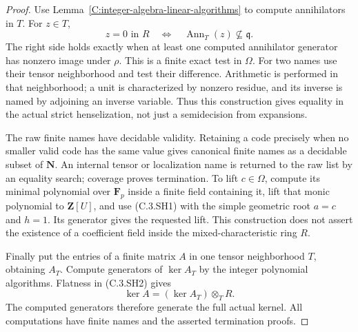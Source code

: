 \begin{proof}
Use Lemma~\ref{C:integer-algebra-linear-algorithms}
to compute annihilators in $T$.  For $z\in T$,
\[
 z=0\text{ in }R
 \quad\Longleftrightarrow\quad
 \operatorname{Ann}_T(z)\not\subseteq\mathfrak q.        \tag{C.3.SH3}
\]
The right side holds exactly when at least one
computed annihilator generator has nonzero image
under $\rho$.  This is a finite exact test in
$\Omega$.  For two names use their tensor
neighborhood and test their difference.
Arithmetic is performed in that neighborhood;
a unit is characterized by nonzero residue,
and its inverse is named by adjoining an inverse
variable.  Thus this construction gives equality
in the actual strict henselization, not just a
semidecision from expansions.

The raw finite names have decidable validity.
Retaining a code precisely when no smaller valid
code has the same value gives canonical finite
names as a decidable subset of $\mathbf N$.
An internal tensor or localization name is returned
to the raw list by an equality search; coverage
proves termination.
To lift $c\in\Omega$, compute its minimal polynomial
over $\mathbf F_p$ inside a finite field containing
it, lift that monic polynomial to $\mathbf Z[U]$,
and use (C.3.SH1) with the simple geometric root
$a=c$ and $h=1$.  Its generator gives the requested
lift.  This construction does not assert the
existence of a coefficient field inside the
mixed-characteristic ring $R$.

Finally put the entries of a finite matrix $A$
in one tensor neighborhood $T$, obtaining $A_T$.
Compute generators of $\ker A_T$ by the integer
polynomial algorithms.  Flatness in (C.3.SH2)
gives
\[
                       \ker A=(\ker A_T)\otimes_T R.
\]
The computed generators therefore generate the
full actual kernel.  All computations have finite
names and the asserted termination proofs.
\end{proof}

